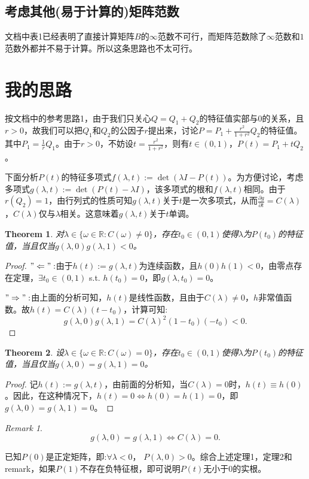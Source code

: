 \documentclass[UTF8]{ctexart}
\theoremstyle{plain}
\newtheorem{thm}{Theorem}
\theoremstyle{definition}
\theoremstyle{remark}
\newtheorem*{rem}{Remark}
\newcommand{\pdfFrac}[2]{\frac{\partial #1}{\partial #2}}
\begin{document}
\subsection{考虑其他(易于计算的)矩阵范数}
文档中表1已经表明了直接计算矩阵$B$的$\infty$范数不可行，而矩阵范数除了$\infty$范数和$1$范数外都并不易于计算。所以这条思路也不太可行。
\section{我的思路}
按文档中的参考思路1，由于我们只关心$Q=Q_{1}+Q_{2}$的特征值实部与0的关系，且$r>0$，故我们可以把$Q_{1}$和$Q_{2}$的公因子$r$提出来，讨论$P=P_{1}+\frac{r^{2}}{1+r^2}Q_{2}$的特征值。其中$P_{1}=\frac{1}{r}Q_{1}$。由于$r>0$，不妨设$t=\frac{r^2}{1+r^2}$，则有$t\in(0,1)$，$P(t)=P_{1}+tQ_{2}$。

下面分析$P(t)$的特征多项式$f(\lambda,t):=\det(\lambda I-P(t))$。为方便讨论，考虑多项式$g(\lambda,t):=\det(P(t)-\lambda I)$，该多项式的根和$f(\lambda,t)$相同。由于$r(Q_{2})=1$，由行列式的性质可知$g(\lambda,t)$关于$t$是一次多项式，从而$\pdfFrac{g}{t}= C(\lambda)$，$C(\lambda)$仅与$\lambda$相关。这意味着$g(\lambda,t)$关于$t$单调。

\begin{thm}
    对$\lambda\in\{\omega\in\mathbb{R}:C(\omega)\neq 0\}$，存在$t_{0}\in (0,1)$使得$\lambda$为$P(t_{0})$的特征值，当且仅当$g(\lambda,0)g(\lambda,1)<0$。
\end{thm}
\begin{proof}
    $"\Leftarrow":$由于$h(t):=g(\lambda,t)$为连续函数，且$h(0)h(1)<0$，由零点存在定理，$\exists t_{0}\in(0,1)$ s.t. $h(t_{0})=0$，即$g(\lambda,t_{0})=0$。

    $"\Rightarrow":$由上面的分析可知，$h(t)$是线性函数，且由于$C(\lambda)\neq 0$，$h$非常值函数。故$h(t)=C(\lambda)(t-t_{0})$，计算可知:
    \begin{equation}
        g(\lambda,0)g(\lambda,1)=C(\lambda)^{2}(1-t_{0})(-t_{0})<0.
    \end{equation}
\end{proof}
\begin{thm}
    设$\lambda\in\{\omega\in\mathbb{R}:C(\omega)=0\}$，存在$t_{0}\in(0,1)$使得$\lambda$为$P(t_{0})$的特征值，当且仅当$g(\lambda,0)=g(\lambda,1)=0$。
\end{thm}
\begin{proof}
    记$h(t):=g(\lambda,t)$，由前面的分析知，当$C(\lambda)=0$时，$h(t)\equiv h(0)$。因此，在这种情况下，$h(t)=0\Leftrightarrow h(0)=h(1)=0$，即$g(\lambda,0)=g(\lambda,1)=0$。
\end{proof}
\begin{rem}
    \begin{equation}
        g(\lambda,0)=g(\lambda,1)\Leftrightarrow C(\lambda)=0.
    \end{equation}
\end{rem}
已知$P(0)$是正定矩阵，即:$\forall\lambda<0$， $P(\lambda,0)>0$。综合上述定理1，定理2和remark，如果$P(1)$不存在负特征根，即可说明$P(t)$无小于0的实根。
\end{document}
